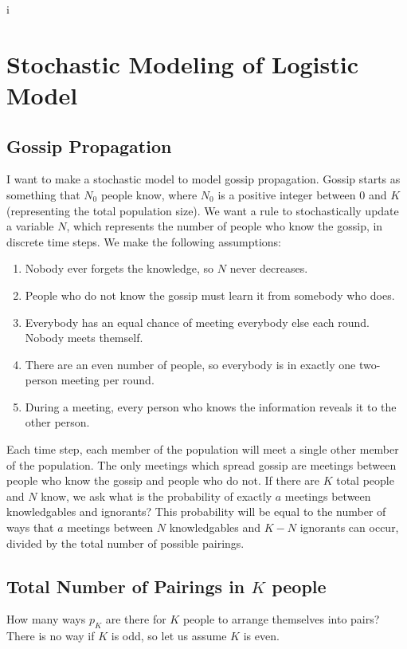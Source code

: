 \documentclass{article}
\begin{document}
i

\section{ Stochastic Modeling of Logistic Model }



\subsection{Gossip Propagation}

I want to make a stochastic model to model gossip propagation.
Gossip starts as something that $N_0$ people know,
	where $N_0$ is a positive integer between $0$ and
	$K$ (representing the total population size).
We want a rule to stochastically update a variable $N$, which
	represents the number of people who know the gossip,
	in discrete time steps.
We make the following assumptions:

\begin{enumerate}
\item Nobody ever forgets the knowledge, 
	so $N$ never decreases.
\item People who do not know the gossip must learn it from
	somebody who does.
\item Everybody has an equal chance of meeting everybody
	else each round.
Nobody meets themself.
\item There are an even number of people, so everybody
	is in exactly one two-person meeting per round.
\item During a meeting, every person who knows the information
	reveals it to the other person.
\end{enumerate}

Each time step, each member of the population will meet a
	single other member of the population.
The only meetings which spread gossip are meetings between
	people who know the gossip and people who do not.
If there are $K$ total people and $N$ know, we ask what
	is the probability of exactly $a$ meetings between
	knowledgables and ignorants?
This probability will be equal to the number of ways that $a$
	meetings between $N$ knowledgables and $K-N$ ignorants
	can occur, divided by the total number of possible 
	pairings.

\subsection{Total Number of Pairings in $K$ people}
How many ways $p_K$ are there for $K$ people to arrange themselves
	into pairs?
There is no way if $K$ is odd, so let us assume $K$ is even.
\end{document}

